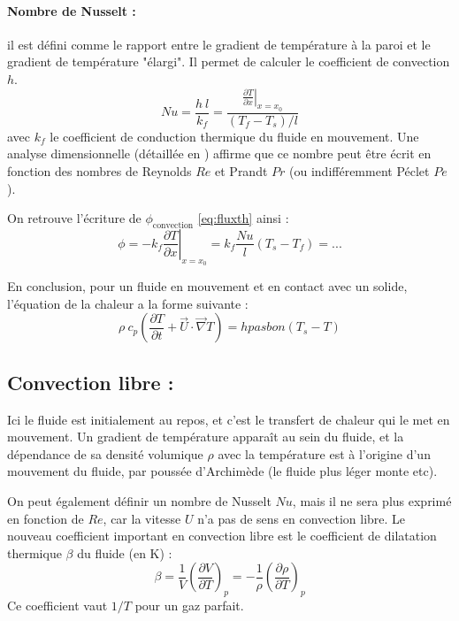 \paragraph{Nombre de Nusselt :}il est défini comme le rapport entre le gradient de température à la paroi et le gradient de température "élargi". Il permet de calculer le coefficient de convection $h$.
%
\begin{equation}
Nu = \frac{h~l}{k_f}
= \frac{\left. \frac{\partial{T}}{\partial{x}} \right|_{x=x_0}}
{ \left( T_f - T_s \right)/l}
\end{equation}
%
avec $k_f$ le coefficient de conduction thermique du fluide en mouvement. Une analyse dimensionnelle (détaillée en \cite{battaglia2010introduction}) affirme que ce nombre peut être écrit en fonction des nombres de Reynolds $Re$ et Prandt $Pr$ (ou indifféremment Péclet $Pe$).

On retrouve l'écriture de $\phi_{\text{convection}}$ \eqref{eq:fluxth} ainsi :
%
\begin{equation}
\phi = - k_f \left. \frac{\partial{T}}{\partial{x}} \right|_{x=x_0}
     = k_f \frac{Nu}{l} \left( T_s - T_f \right)
     = ...
\end{equation}

En conclusion, pour un fluide en mouvement et en contact avec un solide, l'équation de la chaleur a la forme suivante :
%
\begin{equation}
\rho~c_{p} \left( \frac{\partial T}{\partial t}
+ \vec{U} \cdot \vec{\nabla} T \right)
= h pasbon \left( T_s - T \right)
\end{equation}



\subsection{Convection libre :}
Ici le fluide est initialement au repos, et c'est le transfert de chaleur qui le met en mouvement. Un gradient de température apparaît au sein du fluide, et la dépendance de sa densité volumique $\rho$ avec la température est à l'origine d'un mouvement du fluide, par poussée d'Archimède (le fluide plus léger monte etc).

On peut également définir un nombre de Nusselt $Nu$, mais il ne sera plus exprimé en fonction de $Re$, car la vitesse $U$ n'a pas de sens en convection libre. Le nouveau coefficient important en convection libre est le coefficient de dilatation thermique $\beta$ du fluide (en K) :
%
\begin{equation}
\beta = \frac{1}{V} \left( \frac{\partial V}{\partial T} \right)_p
      = - \frac{1}{\rho} \left( \frac{\partial \rho}{\partial T} \right)_p
\end{equation}
%
Ce coefficient vaut $1/T$ pour un gaz parfait.


